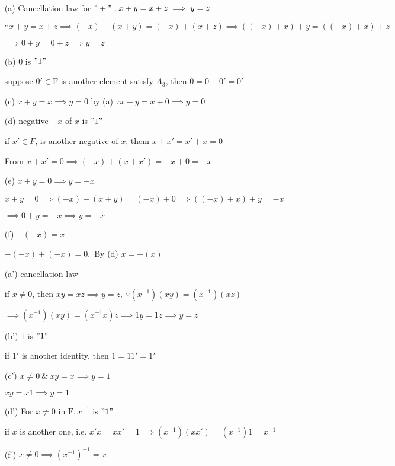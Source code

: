 \begin{enumerate}
	\item[(a)] Cancellation law for $"+":x+y = x+z \implies y = z$
	
	$\because x+y = x+z \implies (-x)+(x+y)=(-x)+(x+z) \implies ((-x)+x)+y = ((-x)+x)+z$
	
	$\implies 0+y = 0+z \implies y=z$
	
	\item[(b)] $0$ is $"1"$
	
	suppose $0' \in \mathrm{F}$ is another element satisfy $A_3$, then $0 = 0+0'=0'$
	\item[(c)] $x+y = x \implies y = 0$ by (a) $\because x+y = x+0 \implies y=0$
	
	\item[(d)] negative $-x$ of $x$ is $"1"$
	
	if $x' \in F$, is another negative of $x$, them $x+x' = x'+x = 0$
	
	From $x + x' = 0 \implies (-x)+(x + x')=-x+0=-x$
	
	\item[(e)] $x+y = 0 \implies y = -x$
	
	$x +y=0 \implies (-x)+(x+y) = (-x)+0 \implies ((-x)+x)+y = -x $
	
	$\implies 0+y = -x \implies y = -x$
	
	\item[(f)] $-(-x) = x $
	
	$-(-x)+(-x) = 0,$ By (d) $x = -(x)$
	
	\item[(a')]cancellation law
	
	if $x \neq 0$, then $xy = xz \implies y = z,~\because (x^{-1})(xy) = (x^{-1})(xz)$
	
	$\implies (x^{-1})(xy) = (x^{-1}x)z \implies 1y = 1z \implies y = z$
	\item[(b')]$1$ is $"1"$
	
	if $1'$ is another identity, then $1 = 11' = 1'$
	
	\item[(c')] $x \neq 0 ~\&~ xy = x \implies y = 1$
	
	$xy = x1 \implies y = 1$
	
	\item[(d')]For $x \neq 0$ in $\mathrm{F}, x^{-1}$ is $"1"$
	
	if $x$ is another one, i.e. $x'x = xx' = 1 \implies (x^{-1})(xx') = (x^{-1})1 = x^{-1}$
	
	\item[(f')]$x \neq 0 \implies (x^{-1})^{-1} = x$
	

\end{enumerate}
